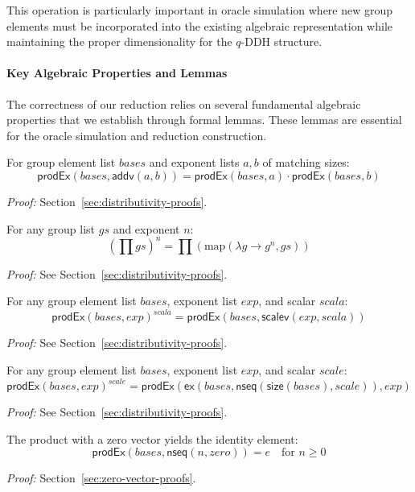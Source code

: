 This operation is particularly important in oracle simulation where new group elements must be incorporated into the existing algebraic representation while maintaining the proper dimensionality for the $q$-DDH structure.

\paragraph{Key Algebraic Properties and Lemmas}

The correctness of our reduction relies on several fundamental algebraic properties that we establish through formal lemmas. These lemmas are essential for the oracle simulation and reduction construction.

\begin{lemma}
\label{lem:prodex-addv-distributive}
For group element list $bases$ and exponent lists $a, b$ of matching sizes:
\[
\mathsf{prodEx}(bases, \mathsf{addv}(a, b)) = \mathsf{prodEx}(bases, a) \cdot \mathsf{prodEx}(bases, b)
\]
\end{lemma}
\noindent \textit{Proof:}  Section~\ref{sec:distributivity-proofs}.

\begin{lemma}
\label{lem:prod-exp-distributive}
For any group list $gs$ and exponent $n$:
\[
(\prod gs)^n = \prod(\text{map}(\lambda g \rightarrow g^n, gs))
\]
\end{lemma}
\noindent \textit{Proof:} See Section~\ref{sec:distributivity-proofs}.

\begin{lemma}
\label{lem:prodex-scale1}
For any group element list $bases$, exponent list $exp$, and scalar $scala$:
\[
\mathsf{prodEx}(bases, exp)^{scala} = \mathsf{prodEx}(bases, \mathsf{scalev}(exp, scala))
\]
\end{lemma}
\noindent \textit{Proof:} See Section~\ref{sec:distributivity-proofs}.

\begin{lemma}
\label{lem:prodex-scale2}
For any group element list $bases$, exponent list $exp$, and scalar $scale$:
\[
\mathsf{prodEx}(bases, exp)^{scale} = \mathsf{prodEx}(\mathsf{ex}(bases, \mathsf{nseq}(\mathsf{size}(bases), scale)), exp)
\]
\end{lemma}
\noindent \textit{Proof:} See Section~\ref{sec:distributivity-proofs}.

\begin{lemma}
\label{lem:prodex-nseq-zero}
The product with a zero vector yields the identity element:
\[
\mathsf{prodEx}(bases, \mathsf{nseq}(n, zero)) = e \quad \text{for } n \geq 0
\]
\end{lemma}
\noindent \textit{Proof:}  Section~\ref{sec:zero-vector-proofs}.

